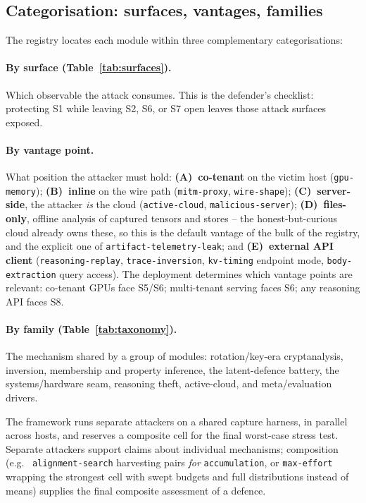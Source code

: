 \documentclass[11pt]{article}
\newcommand{\attack}[1]{\nolinkurl{#1}}
\newcommand{\eg}{e.g.\ }
\begin{document}
\subsection{Categorisation: surfaces, vantages, families}

The registry locates each module within three complementary categorisations:

\paragraph{By surface (Table~\ref{tab:surfaces}).} Which observable the
attack consumes. This is the defender's checklist: protecting S1 while
leaving S2, S6, or S7 open leaves those attack surfaces exposed.

\paragraph{By vantage point.} What position the attacker must hold:
\textbf{(A)~co-tenant} on the victim host (\attack{gpu-memory});
\textbf{(B)~inline} on the wire path (\attack{mitm-proxy},
\attack{wire-shape}); \textbf{(C)~server-side}, the attacker \emph{is} the
cloud (\attack{active-cloud}, \attack{malicious-server});
\textbf{(D)~files-only}, offline analysis of captured tensors and stores -- the honest-but-curious cloud already owns these, so this is the default
vantage of the bulk of the registry, and the explicit one of
\attack{artifact-telemetry-leak}; and \textbf{(E)~external API
client} (\attack{reasoning-replay}, \attack{trace-inversion},
\attack{kv-timing} endpoint mode, \attack{body-extraction} query access).
The deployment determines which vantage points are relevant:
co-tenant GPUs face S5/S6; multi-tenant serving faces S6; any reasoning
API faces S8.

\paragraph{By family (Table~\ref{tab:taxonomy}).} The mechanism shared by
a group of modules: rotation/key-era cryptanalysis, inversion, membership
and property inference, the latent-defence battery, the systems/hardware
seam, reasoning theft, active-cloud, and meta/evaluation drivers.

The framework runs separate attackers on a shared capture harness, in
parallel across hosts, and reserves a composite cell for the final
worst-case stress test. Separate attackers support claims about individual
mechanisms; composition (\eg{} \attack{alignment-search} harvesting pairs
\emph{for} \attack{accumulation}, or \attack{max-effort} wrapping the
strongest cell with swept budgets and full distributions instead of means)
supplies the final composite assessment of a defence.
\end{document}
